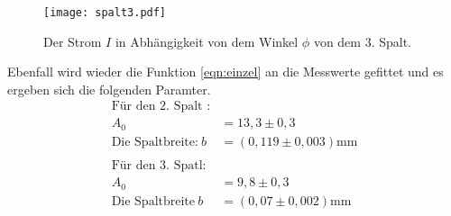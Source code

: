 \begin{figure}
  \centering
  \texttt{[image: spalt3.pdf]}
  \caption{ Der Strom $I$ in Abhängigkeit von dem Winkel $\phi$ von dem 3. Spalt.}
  \label{fig:spalt3}
\end{figure}
\FloatBarrier
Ebenfall wird wieder die Funktion \eqref{eqn:einzel}
an die Messwerte gefittet und es ergeben sich die folgenden Paramter.
\begin{align*}
  \text{Für den 2. Spalt :}\\
  A_0&=13,3\pm0,3\\
\text{Die Spaltbreite:} \ b&=(0,119\pm0,003)\si{\milli\meter}\\
\\
\text{Für den 3. Spatl:}\\
  A_0&=9,8\pm0,3\\
  \text{Die Spaltbreite}\ b&=(0,07\pm0,002)\si{\milli\meter}\\
\end{align*}


